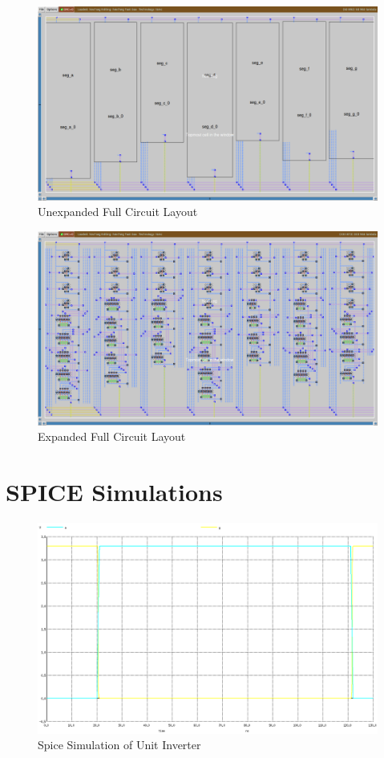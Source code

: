 \documentclass[12pt]{article}
\begin{document}
\begin{figure}
\centering
	\includegraphics[width=\textwidth]{Graphics/hex7seg_unexpanded}
	\caption{Unexpanded Full Circuit Layout}
	\label{fig:hex7seg_unexpanded}
\end{figure}

\begin{figure}
	\includegraphics[width=\textwidth]{Graphics/hex7seg_expanded}
	\caption{Expanded Full Circuit Layout}
	\label{fig:hex7seg_expanded}
\end{figure}

\section{SPICE Simulations}
\label{app:spice}

\begin{figure}[H]
	\centering
	\includegraphics[width=0.70\linewidth, keepaspectratio]{Graphics/1INV_spice}
	\caption{Spice Simulation of Unit Inverter}
	\label{fig:spice_INV}
\end{figure}
\end{document}

